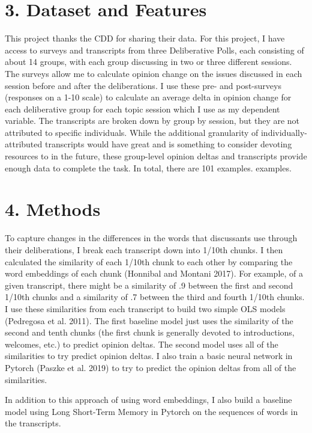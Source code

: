 \documentclass[12pt,]{article}
\begin{document}
\hypertarget{dataset-and-features}{%
\section{3. Dataset and Features}\label{dataset-and-features}}

This project thanks the CDD for sharing their data. For this project, I
have access to surveys and transcripts from three Deliberative Polls,
each consisting of about 14 groups, with each group discussing in two or
three different sessions. The surveys allow me to calculate opinion
change on the issues discussed in each session before and after the
deliberations. I use these pre- and post-surveys (responses on a 1-10
scale) to calculate an average delta in opinion change for each
deliberative group for each topic session which I use as my dependent
variable. The transcripts are broken down by group by session, but they
are not attributed to specific individuals. While the additional
granularity of individually-attributed transcripts would have great and
is something to consider devoting resources to in the future, these
group-level opinion deltas and transcripts provide enough data to
complete the task. In total, there are 101 examples. examples.

\hypertarget{methods}{%
\section{4. Methods}\label{methods}}

To capture changes in the differences in the words that discussants use
through their deliberations, I break each transcript down into 1/10th
chunks. I then calculated the similarity of each 1/10th chunk to each
other by comparing the word embeddings of each chunk (Honnibal and
Montani 2017). For example, of a given transcript, there might be a
similarity of .9 between the first and second 1/10th chunks and a
similarity of .7 between the third and fourth 1/10th chunks. I use these
similarities from each transcript to build two simple OLS models
(Pedregosa et al. 2011). The first baseline model just uses the
similarity of the second and tenth chunks (the first chunk is generally
devoted to introductions, welcomes, etc.) to predict opinion deltas. The
second model uses all of the similarities to try predict opinion deltas.
I also train a basic neural network in Pytorch (Paszke et al. 2019) to
try to predict the opinion deltas from all of the similarities.

In addition to this approach of using word embeddings, I also build a
baseline model using Long Short-Term Memory in Pytorch on the sequences
of words in the transcripts.
\end{document}
